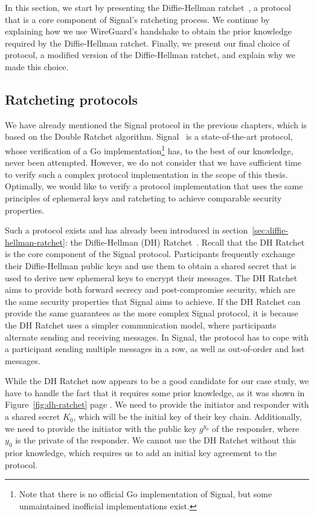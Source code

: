 In this section, we start by presenting the Diffie-Hellman ratchet~\cite{perrin2016double}, a protocol that is a core component of Signal's ratcheting process.
We continue by explaining how we use WireGuard's handshake to obtain the prior knowledge required by the Diffie-Hellman ratchet.
Finally, we present our final choice of protocol, a modified version of the Diffie-Hellman ratchet, and explain why we made this choice.

\subsection{Ratcheting protocols}
\label{sec:ratcheting-protocols}

We have already mentioned the Signal protocol in the previous chapters, which is based on the Double Ratchet algorithm.
Signal~\cite{marlinspike2016x3dh} is a state-of-the-art protocol, whose verification of a Go implementation\footnote{Note that there is no official Go implementation of Signal, but some unmaintained inofficial implementations exist.} has, to the best of our knowledge, never been attempted.
However, we do not consider that we have sufficient time to verify such a complex protocol implementation in the scope of this thesis.
Optimally, we would like to verify a protocol implementation that uses the same principles of ephemeral keys and ratcheting to achieve comparable security properties.

Such a protocol exists and has already been introduced in section~\ref{sec:diffie-hellman-ratchet}: the Diffie-Hellman (DH) Ratchet~\cite{perrin2016double}.
Recall that the DH Ratchet is the core component of the Signal protocol. Participants frequently exchange their Diffie-Hellman public keys and use them to obtain a shared secret that is used to derive new ephemeral keys to encrypt their messages.
The DH Ratchet aims to provide both forward secrecy and post-compromise security, which are the same security properties that Signal aims to achieve.
If the DH Ratchet can provide the same guarantees as the more complex Signal protocol, it is because the DH Ratchet uses a simpler communication model, where participants alternate sending and receiving messages.
In Signal, the protocol has to cope with a participant sending multiple messages in a row, as well as out-of-order and lost messages.

While the DH Ratchet now appears to be a good candidate for our case study, we have to handle the fact that it requires some prior knowledge, as it was shown in Figure~\ref{fig:dh-ratchet} page \pageref{fig:dh-ratchet}.
We need to provide the initiator and responder with a shared secret $K_0$, which will be the initial key of their key chain.
Additionally, we need to provide the initiator with the public key $g^{y_0}$ of the responder, where $y_0$ is the private of the responder.
We cannot use the DH Ratchet without this prior knowledge, which requires us to add an initial key agreement to the protocol.

